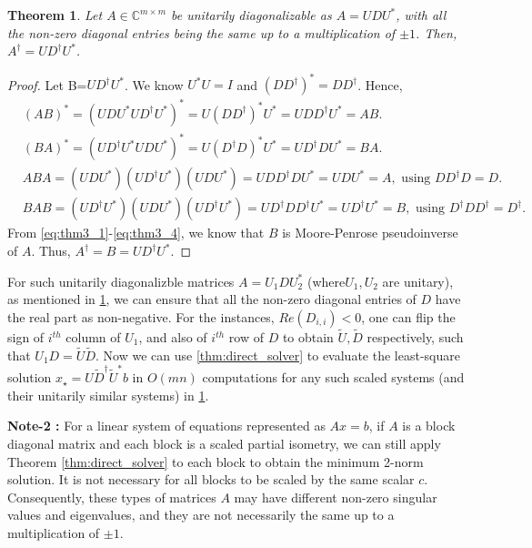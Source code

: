 \documentclass[a4paper,fleqn]{cas-sc}
\newtheorem{theorem}{Theorem}[section]      %
\theoremstyle{definition}
\theoremstyle{remark}
\begin{document}
\begin{theorem}\label{thm:thm3}
    Let $A \in \mathbb{C}^{m \times m}$ be unitarily diagonalizable as $A= UDU^*$, with all the non-zero diagonal entries being the same up to a multiplication of $\pm 1$. Then, $A^\dagger=UD^\dagger U^*$.
\end{theorem}
\begin{proof}
    Let B=$UD^\dagger U^*$. We know $U^*U=I$ and $(DD^\dagger)^*=DD^\dagger$. Hence,
    \begin{align}
        & (AB)^*=(UDU^*UD^\dagger U^*)^*=U(D D^\dagger)^* U^*=UDD^\dagger U^*=AB. \label{eq:thm3_1}\\
        & (BA)^{*}=(UD^\dagger U^*UDU^*)^*=U(D^\dagger D)^*U^*=UD^\dagger DU^*=BA. \label{eq:thm3_2}\\
        & ABA=(UDU^*)(U D^\dagger U^*)(UDU^*)=UDD^\dagger DU^*=UDU^*=A,\label{eq:thm3_3} \text{ using $DD^\dagger D=D$.}\\
        & BAB=(UD^\dagger U^*)(UDU^*)(UD^\dagger U^*)=UD^\dagger DD^\dagger U^*= UD^\dagger U^*=B,\label{eq:thm3_4} \text{ using $D^\dagger D D^\dagger =D^\dagger$.}
    \end{align}
    From \eqref{eq:thm3_1}-\eqref{eq:thm3_4}, we know that $B$ is Moore-Penrose pseudoinverse of $A$. Thus, $A^\dagger = B = U D^\dagger U^*$.
\end{proof}

For such unitarily diagonalizble matrices $A=U_1DU_2^*$ (where$U_1,U_2$ are unitary), as mentioned in \cref{thm:thm3}, we can ensure that all the non-zero diagonal entries of $D$ have the real part as non-negative. For the instances, $Re(D_{i,i})<0$, one can flip the sign of $i^{th}$ column of $U_1$, and also of $i^{th}$ row of $D$ to obtain $\tilde{U}, \tilde{D}$ respectively, such that $U_1D=\tilde{U}\tilde{D}$. Now we can use \cref{thm:direct_solver} to evaluate the least-square solution $x_\star=U\tilde{D}^\dagger\tilde{U}^*b$ in $O(mn)$ computations for any such scaled systems (and their unitarily similar systems) in \cref{thm:thm3}.

\textbf{Note-2 :} For a linear system of equations represented as \( Ax = b \), if \( A \) is a block diagonal matrix and each block is a scaled partial isometry, we can still apply Theorem \ref{thm:direct_solver} to each block to obtain the minimum 2-norm solution. It is not necessary for all blocks to be scaled by the same scalar \( c \). Consequently, these types of matrices \( A \) may have different non-zero singular values and eigenvalues, and they are not necessarily the same up to a multiplication of \( \pm 1 \).
\end{document}
